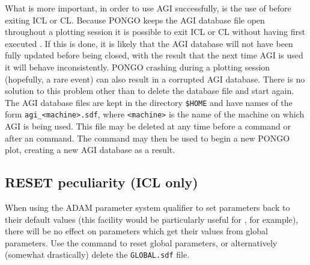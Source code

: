 What is more important, in order to use AGI successfully, is the use
of  before exiting ICL or CL.  Because PONGO keeps the
AGI database file open throughout a plotting session it is possible to
exit ICL or CL without having first executed .  If this
is done, it is likely that the AGI database will not have been fully
updated before being closed, with the result that the next time AGI is
used it will behave inconsistently.  PONGO crashing during a plotting
session (hopefully, a rare event) can also result in a corrupted AGI
database.  There is no solution to this problem other than to delete
the database file and start again.  The AGI database files are kept in
the directory \verb+$HOME+ and have names of the form
\verb+agi_<machine>.sdf+, where \verb+<machine>+ is the name of the
machine on which AGI is being used.  This file may be deleted at any
time before a  command or after an  command.
The  command may then be used to begin a new PONGO plot,
creating a new AGI database as a result.


\subsection{RESET peculiarity (ICL only)}

When using the ADAM parameter system  
qualifier to set parameters back to their default values (this
facility would be particularly useful for , for
example), there will be no effect on parameters which get their values
from global parameters. Use the  command to
reset global parameters, or alternatively (somewhat drastically)
delete the \verb+GLOBAL.sdf+ file.

